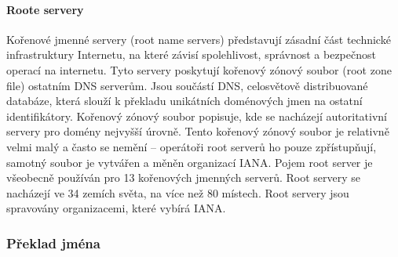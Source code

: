 \documentclass[10pt,a4paper]{article}
\begin{document}
\paragraph{Roote servery} Kořenové jmenné servery (root name servers) představují zásadní část technické infrastruktury Internetu, na které závisí spolehlivost, správnost a bezpečnost operací na internetu. Tyto servery poskytují kořenový zónový soubor (root zone file) ostatním DNS serverům. Jsou součástí DNS, celosvětově distribuované databáze, která slouží k překladu unikátních doménových jmen na ostatní identifikátory. Kořenový zónový soubor popisuje, kde se nacházejí autoritativní servery pro domény nejvyšší úrovně. Tento kořenový zónový soubor je relativně velmi malý a často se nemění – operátoři root serverů ho pouze zpřístupňují, samotný soubor je vytvářen a měněn organizací IANA. Pojem root server je všeobecně používán pro 13 kořenových jmenných serverů. Root servery se nacházejí ve 34 zemích světa, na více než 80 místech. Root servery jsou spravovány organizacemi, které vybírá IANA.

\subsubsection{Překlad jména}
\end{document}
